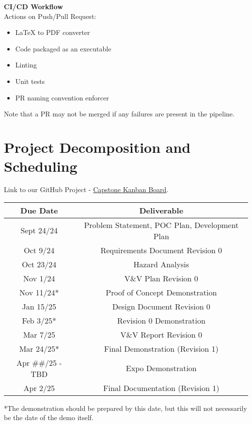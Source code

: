 \documentclass{article}
\begin{document}
\noindent
\textbf{CI/CD Workflow}\\
Actions on Push/Pull Request:
\begin{itemize}
  \item LaTeX to PDF converter
  \item Code packaged as an executable
  \item Linting
  \item Unit tests
  \item PR naming convention enforcer
\end{itemize}

\noindent Note that a PR may not be merged if any failures are present in the pipeline.

\section{Project Decomposition and Scheduling}
Link to our GitHub Project - \href{https://github.com/users/emilyperica/projects/1}{Capstone Kanban Board}.

\begin{center}
  \begin{tabular}{ |c|c| } 
    \hline
      \textbf{Due Date} & \textbf{Deliverable} \\
    \hline
      Sept 24/24 & Problem Statement, POC Plan, Development Plan \\
    \hline
      Oct 9/24 & Requirements Document Revision 0 \\
    \hline
      Oct 23/24 & Hazard Analysis \\
    \hline
      Nov 1/24 & V\&V Plan Revision 0 \\
    \hline
      Nov 11/24* & Proof of Concept Demonstration \\
    \hline
      Jan 15/25 & Design Document Revision 0 \\
    \hline
      Feb 3/25* & Revision 0 Demonstration \\
    \hline
      Mar 7/25 & V\&V Report Revision 0 \\
    \hline
      Mar 24/25* & Final Demonstration (Revision 1) \\
    \hline
      Apr \#\#/25 - TBD & Expo Demonstration \\
    \hline
      Apr 2/25 & Final Documentation (Revision 1) \\
    \hline
  \end{tabular}
\end{center}
*The demonstration should be prepared by this date, but this will not necessarily be the date of the demo itself.
\end{document}
